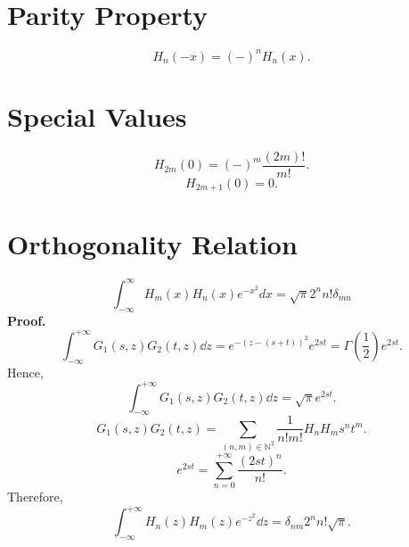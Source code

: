 \documentclass{article}
\theoremstyle{1}
\theoremstyle{2}
\begin{document}
\section{Parity Property}
\begin{equation}
    H_n(-x)=(-)^nH_n(x).
\end{equation}
\section{Special Values}
\begin{equation}
    H_{2m}(0)=(-)^m\frac{(2m)!}{m!}.
\end{equation}
\begin{equation}
    H_{2m+1}(0)=0.
\end{equation}
\section{Orthogonality Relation}
\begin{equation}
    \int_{-\infty}^{\infty} H_m(x) H_n(x) e^{-x^2} dx = \sqrt{\pi} 2^n n! \delta_{mn}
\end{equation}
\textbf{Proof.}
\begin{equation}
        \int_{-\infty}^{+\infty}G_1(s,z)G_2(t,z)\dd{z}=e^{-(z-(s+t))^2}e^{2st}=\Gamma(\frac{1}{2})e^{2st}.
    \end{equation}
    Hence,
    \begin{equation}
        \int_{-\infty}^{+\infty}G_1(s,z)G_2(t,z)\dd{z}=\sqrt{\pi}e^{2st}.
    \end{equation}
    \begin{equation}
        G_1(s,z)G_2(t,z)=\sum_{(n,m)\in \mathbb{N}^2}\frac{1}{n!m!}H_nH_ms^nt^m.
    \end{equation}
    \begin{equation}
        e^{2st}=\sum_{n=0}^{+\infty}\frac{(2st)^n}{n!}.
    \end{equation}
    Therefore,
    \begin{equation}
        \boxed{\int_{-\infty}^{+\infty}H_n(z)H_m(z)e^{-z^2}\dd{z}=\delta_{nm}2^nn!\sqrt{\pi}.}
    \end{equation}
\end{document}
